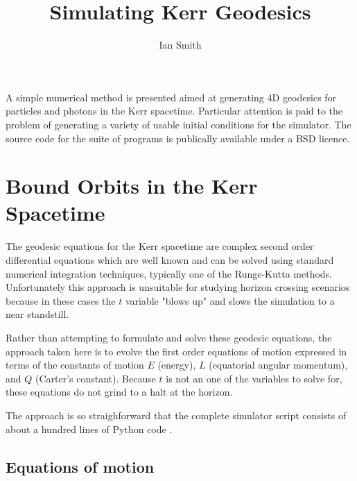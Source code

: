 \documentclass[11pt]{article}
\title{\textbf{Simulating Kerr Geodesics}}
\author{Ian Smith}
\date{}
\begin{document}
\maketitle

\abstract
A simple numerical method is presented aimed at generating 4D geodesics for particles and photons in the Kerr spacetime.  Particular attention is paid to the problem of generating a variety of usable initial conditions for the simulator.  The source code for the suite of programs is publically available under a BSD licence.

\section{Bound Orbits in the Kerr Spacetime}

The geodesic equations for the Kerr spacetime are complex second order differential equations which are well known and can be solved using standard numerical integration techniques, typically one of the Runge-Kutta methods.  Unfortunately this approach is unsuitable for studying horizon crossing scenarios because in these cases the $t$ variable "blows up" and slows the simulation to a near standstill.

Rather than attempting to formulate and solve these geodesic equations, the approach taken here is to evolve the first order equations of motion expressed in terms of the constants of motion $E$ (energy), $L$ (equatorial angular momentum), and $Q$ (Carter's constant).  Because $t$ is not an one of the variables to solve for, these equations do not grind to a halt at the horizon.

The approach is so straighforward that the complete simulator script consists of about a hundred lines of Python code \cite{m4r35n357}.

\subsection {Equations of motion}
\end{document}
